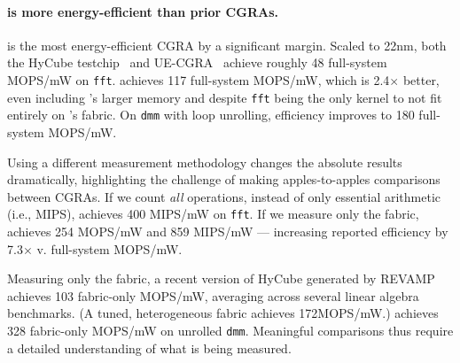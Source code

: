 \paragraph{\riptide is more energy-efficient than prior CGRAs.}
\riptide is the most energy-efficient CGRA by a significant margin.
% 
Scaled to 22nm,
both the HyCube testchip~\cite{wang2019hycube} and
UE-CGRA~\cite{torng_pan_2021} achieve roughly 48 full-system MOPS/mW on {\tt fft}.
%
% 
\riptide achieves 117 full-system MOPS/mW,
which is 2.4$\times$ better,
%
even including \riptide's larger memory and
despite {\tt fft} being the only kernel to not fit entirely on \riptide's fabric.
%
On {\tt dmm} with loop unrolling,
efficiency improves to 180 full-system MOPS/mW.
% 
% 

Using a different measurement methodology changes the absolute results dramatically,
highlighting the challenge of making apples-to-apples comparisons between CGRAs.
%
If we count {\em all} operations, instead of only essential arithmetic (i.e., MIPS),
\riptide achieves 400 MIPS/mW on {\tt fft}.
%
If we measure only the fabric, \riptide achieves 254 MOPS/mW
and 859 MIPS/mW --- increasing reported efficiency by 7.3$\times$ v. full-system MOPS/mW.

Measuring only the fabric,
a recent version of HyCube generated by REVAMP~\cite{revamp}
achieves 103 fabric-only MOPS/mW,
averaging across several linear
algebra benchmarks.
%
(A tuned, heterogeneous fabric achieves 172MOPS/mW.)
%
\riptide achieves 328 fabric-only MOPS/mW on unrolled {\tt dmm}.
%
Meaningful comparisons thus require a detailed understanding
of what is being measured.

